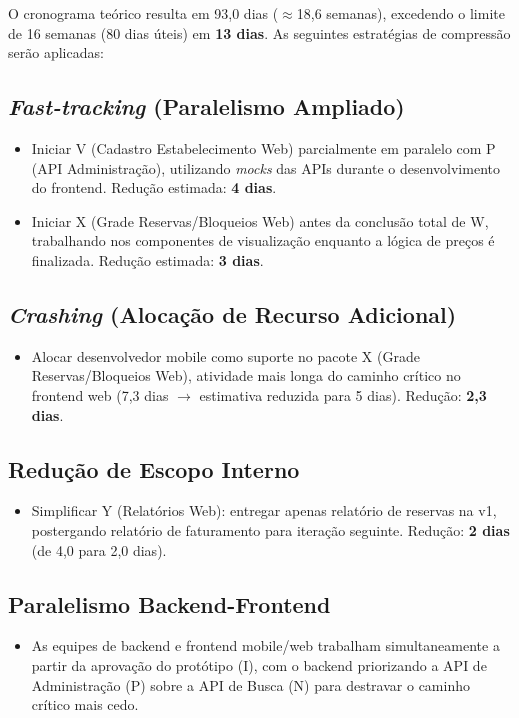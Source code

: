 \documentclass[12pt,a4paper,oneside]{report}
\begin{document}
O cronograma teórico resulta em 93,0 dias ($\approx$18,6 semanas), excedendo o limite de 16 semanas (80 dias úteis) em \textbf{13 dias}. As seguintes estratégias de compressão serão aplicadas:

\subsection{\textit{Fast-tracking} (Paralelismo Ampliado)}
\begin{itemize}
    \item Iniciar V (Cadastro Estabelecimento Web) parcialmente em paralelo com P (API Administração), utilizando \textit{mocks} das APIs durante o desenvolvimento do frontend. Redução estimada: \textbf{4 dias}.
    \item Iniciar X (Grade Reservas/Bloqueios Web) antes da conclusão total de W, trabalhando nos componentes de visualização enquanto a lógica de preços é finalizada. Redução estimada: \textbf{3 dias}.
\end{itemize}

\subsection{\textit{Crashing} (Alocação de Recurso Adicional)}
\begin{itemize}
    \item Alocar desenvolvedor mobile como suporte no pacote X (Grade Reservas/Bloqueios Web), atividade mais longa do caminho crítico no frontend web (7,3 dias $\rightarrow$ estimativa reduzida para 5 dias). Redução: \textbf{2,3 dias}.
\end{itemize}

\subsection{Redução de Escopo Interno}
\begin{itemize}
    \item Simplificar Y (Relatórios Web): entregar apenas relatório de reservas na v1, postergando relatório de faturamento para iteração seguinte. Redução: \textbf{2 dias} (de 4,0 para 2,0 dias).
\end{itemize}

\subsection{Paralelismo Backend-Frontend}
\begin{itemize}
    \item As equipes de backend e frontend mobile/web trabalham simultaneamente a partir da aprovação do protótipo (I), com o backend priorizando a API de Administração (P) sobre a API de Busca (N) para destravar o caminho crítico mais cedo.
\end{itemize}
\end{document}
